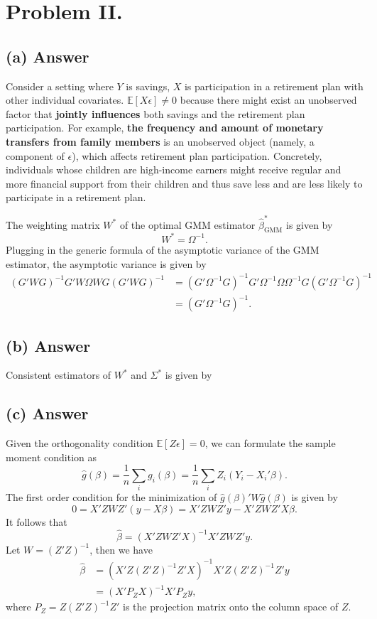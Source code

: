 \documentclass[11pt]{article}
\theoremstyle{definition}
\theoremstyle{boldtitle} %
\numberwithin{equation}{section}
\numberwithin{figure}{section}
\numberwithin{table}{section}
\begin{document}
\section*{Problem II.}
\subsection{(a) Answer}
Consider a setting where $Y$ is savings, $X$ is participation in a retirement plan with 
other individual covariates.
$\mathbb{E}[X\epsilon] \neq 0$ because there might exist an unobserved factor that \textbf{jointly influences}
both savings and the retirement plan participation.
For example, \textbf{the frequency and amount of monetary transfers from family members} is an unobserved object 
(namely, a component of $\epsilon$), which affects retirement plan participation.
Concretely, individuals whose children are high-income earners might 
receive regular and more financial support from their children and thus save less and are less likely to participate in a retirement plan.


The weighting matrix $W^*$ of the optimal GMM estimator $\hat{\beta}^*_{\text{GMM}}$ is given by 
\[
W^* = \Omega^{-1}.
\]
Plugging in the generic formula of the asymptotic variance of the GMM estimator,
the asymptotic variance is given by 
\begin{align*}
    (G'WG)^{-1}G'W\Omega W G(G'WG)^{-1} 
    & = (G'\Omega^{-1}G)^{-1}G'\Omega^{-1}\Omega \Omega^{-1} G(G'\Omega^{-1}G)^{-1} \\
    & = (G'\Omega^{-1}G)^{-1}.
\end{align*}


\subsection{(b) Answer}
Consistent estimators of $W^*$ and $\Sigma^*$ is given by 


\subsection{(c) Answer}
Given the orthogonality condition $\mathbb{E}[Z\epsilon] = 0$, we can formulate the sample moment condition as
\[
\hat{g}(\beta) = \frac{1}{n} \sum_i g_i(\beta) = \frac{1}{n} \sum_i Z_i (Y_i - X_i'\beta).
\]
The first order condition for the minimization of $\hat{g}(\beta)' W \hat{g}(\beta)$ is given by
\[
0 = X'Z W Z'(y - X\beta) = X'Z W Z' y - X'Z W Z' X \beta.
\]
It follows that 
\[
\hat{\beta} = \left( X'Z W Z' X \right)^{-1} X'Z W Z' y.
\]
Let $W = (Z'Z)^{-1}$, then we have
\begin{align*}
\hat{\beta} & = \left( X'Z (Z'Z)^{-1} Z' X \right)^{-1} X'Z (Z'Z)^{-1} Z' y \\ 
    & = \left( X' P_Z X \right)^{-1} X' P_Z y,
\end{align*}
where $P_Z = Z(Z'Z)^{-1}Z'$ is the projection matrix onto the column space of $Z$.



\end{document}

